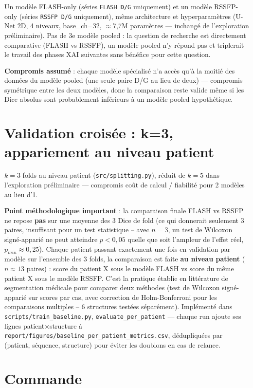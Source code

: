 \documentclass[11pt,a4paper]{report}
\begin{document}
Un modèle FLASH-only (séries \texttt{FLASH D/G} uniquement) et un modèle RSSFP-only
(séries \texttt{RSSFP D/G} uniquement), même architecture et hyperparamètres
(U-Net 2D, 4 niveaux, base\_ch=32, $\approx$7,7M paramètres --- inchangé de
l'exploration préliminaire). Pas de 3e modèle pooled : la question de recherche est
directement comparative (FLASH vs RSSFP), un modèle pooled n'y répond pas et
triplerait le travail des phases XAI suivantes sans bénéfice pour cette question.

\textbf{Compromis assumé} : chaque modèle spécialisé n'a accès qu'à la moitié des
données du modèle pooled (une seule paire D/G au lieu de deux) --- compromis
symétrique entre les deux modèles, donc la comparaison reste valide même si les Dice
absolus sont probablement inférieurs à un modèle pooled hypothétique.

\section{Validation croisée : k=3, appariement au niveau patient}
\label{sec:protocole-cv}

$k=3$ folds au niveau patient (\texttt{src/splitting.py}), réduit de $k=5$ dans
l'exploration préliminaire --- compromis coût de calcul / fiabilité pour 2 modèles au
lieu d'1.

\textbf{Point méthodologique important} : la comparaison finale FLASH vs RSSFP ne
repose \textbf{pas} sur une moyenne des 3 Dice de fold (ce qui donnerait seulement 3
paires, insuffisant pour un test statistique -- avec $n=3$, un test de Wilcoxon
signé-apparié ne peut atteindre $p<0{,}05$ quelle que soit l'ampleur de l'effet réel,
$p_{min} \approx 0{,}25$). Chaque patient passant exactement une fois en validation
par modèle sur l'ensemble des 3 folds, la comparaison est faite \textbf{au niveau
patient} ($n\approx13$ paires) : score du patient X sous le modèle FLASH vs score du
même patient X sous le modèle RSSFP. C'est la pratique établie en littérature de
segmentation médicale pour comparer deux méthodes (test de Wilcoxon signé-apparié sur
scores par cas, avec correction de Holm-Bonferroni pour les comparaisons multiples --
6 structures testées séparément). Implémenté dans
\texttt{scripts/train\_baseline.py}, \texttt{evaluate\_per\_patient} ---
chaque run ajoute ses lignes patient$\times$structure à
\texttt{report/figures/baseline\_per\_patient\_metrics.csv}, dédupliquées par
(patient, séquence, structure) pour éviter les doublons en cas de relance.

\section{Commande}
\end{document}
